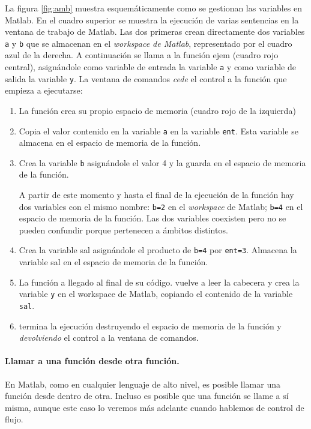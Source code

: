 La figura \ref{fig:amb} muestra esquemáticamente como se gestionan las variables en Matlab. En el cuadro superior se muestra la ejecución de varias sentencias en la ventana de trabajo de Matlab. Las dos primeras crean directamente dos variables \texttt{a} y \texttt{b} que se almacenan en el \emph{workspace de Matlab}, representado por el cuadro azul de la derecha. 
A continuación se llama a la función ejem (cuadro rojo central), asignándole como variable de entrada la variable \texttt{a} y como variable de salida la variable \texttt{y}. La ventana de comandos \emph{cede} el control a la función que empieza a ejecutarse:
\begin{enumerate}
\item La función crea su propio espacio de memoria (cuadro rojo de la izquierda)
\item Copia el valor contenido en la variable \texttt{a} en la variable \texttt{ent}. Esta variable se almacena en el espacio de memoria de la función.
\item Crea la variable \texttt{b} asignándole el valor 4 y la guarda en el espacio de memoria de la función. 

A partir de este momento y hasta el final de la ejecución de la función hay dos variables con el mismo nombre: \texttt{b=2} en el \emph{workspace} de Matlab; \texttt{b=4} en el espacio de memoria de la función. Las dos variables coexisten pero no se pueden confundir porque pertenecen a ámbitos distintos.
\item Crea la variable sal asignándole el producto de \texttt{b=4} por \texttt{ent=3}. Almacena la variable sal en el espacio de memoria de la función.
\item La función a llegado al final de su código. vuelve a leer la cabecera y crea la variable \texttt{y} en el workspace de Matlab, copiando el contenido de la variable \texttt{sal}.
\item termina la ejecución destruyendo el espacio de memoria de la función y \emph{devolviendo} el control a la ventana de comandos.
\end{enumerate}

\paragraph{Llamar a una función desde otra función.}
En Matlab, como en cualquier lenguaje de alto nivel, es posible llamar una función desde dentro de otra. Incluso es posible que una función se llame a sí misma, aunque este caso lo veremos más adelante cuando hablemos de control de flujo. 

